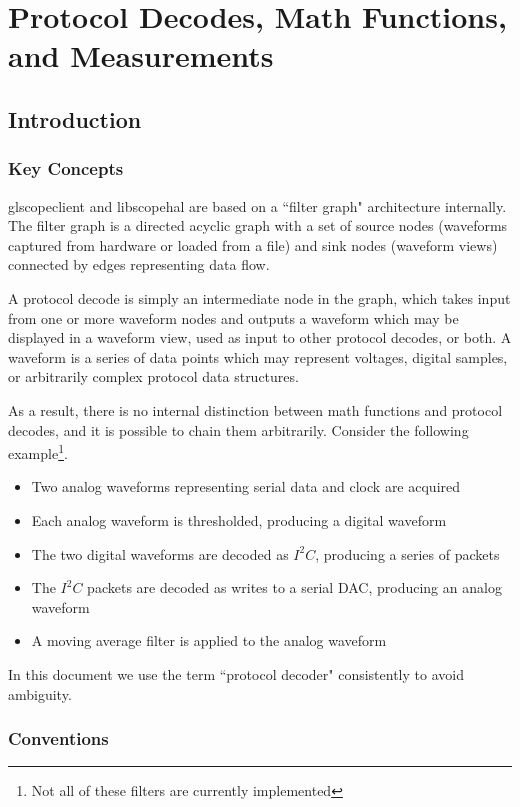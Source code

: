 \section{Protocol Decodes, Math Functions, and Measurements}

\subsection{Introduction}

\subsubsection{Key Concepts}

glscopeclient and libscopehal are based on a ``filter graph" architecture internally. The filter graph is a directed
acyclic graph with a set of source nodes (waveforms captured from hardware or loaded from a file) and sink nodes
(waveform views) connected by edges representing data flow.

A protocol decode is simply an intermediate node in the graph, which takes input from one or more waveform nodes and
outputs a waveform which may be displayed in a waveform view, used as input to other protocol decodes, or both. A
waveform is a series of data points which may represent voltages, digital samples, or arbitrarily complex protocol data
structures.

As a result, there is no internal distinction between math functions and protocol decodes, and it is possible to chain
them arbitrarily. Consider the following example\footnote{Not all of these filters are currently implemented}.

\begin{itemize}
\item Two analog waveforms representing serial data and clock are acquired
\item Each analog waveform is thresholded, producing a digital waveform
\item The two digital waveforms are decoded as $I^2C$, producing a series of packets
\item The $I^2C$ packets are decoded as writes to a serial DAC, producing an analog waveform
\item A moving average filter is applied to the analog waveform
\end{itemize}

In this document we use the term ``protocol decoder" consistently to avoid ambiguity.

\subsubsection{Conventions}

